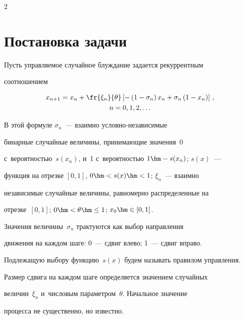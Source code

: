 \begin{multicols}{2}
{}


  


  \section{Постановка задачи}


  


  Пусть управляемое случайное блуж\-да\-ние задается рекуррентным 


соотношением


  \begin{multline*}


  x_{n+1}=x_n+\fr{\xi_n}{\theta}\left[ -\left( 1-\sigma_n\right) x_n +\sigma_n 


\left( 1-x_n\right)\right]\,,\\


  n=0,1,2,\ldots


\end{multline*}


    В этой формуле $\sigma_n$~--- взаимно услов\-но-не\-за\-ви\-си\-мые 


бинарные случайные величины, принима\-ющие значения~0 


с~вероятностью~$s(x_n)$, и~1 с~вероятностью $1\hm- s(x_n)$; $s(x)$~--- 


функция на отрезке $[0,1]$, $0\hm< s(x)\hm<1$; $\xi_n$~---  взаимно 


независимые случайные величины, равномерно распределенные на 


отрезке~$[0, 1]$; $0\hm< \theta\hm\leq 1$; $x_0\hm\in 


[0,1]$.


  


  Значения величины~$\sigma_n$ трактуются как выбор на\-прав\-ле\-ния 


движения на каждом шаге: 0~--- сдвиг влево; 1~--- сдвиг вправо. 


Подлежащую выбору функцию~$s(x)$ будем называть правилом управ\-ле\-ния. 


Размер сдвига на каждом шаге определяется значением случайных 


величин~$\xi_n$ и~чис\-ло\-вым па\-ра\-мет\-ром~$\theta$. Начальное значение 


процесса не существенно, но известно.


  



\end{multicols}
